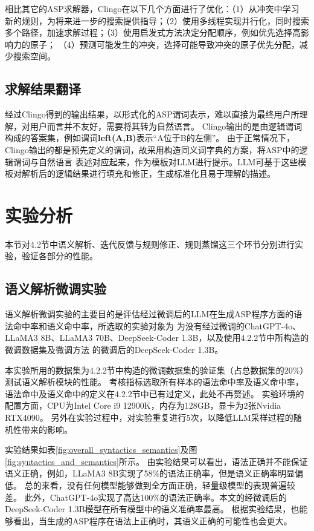 相比其它的ASP求解器，Clingo在以下几个方面进行了优化：（1）从冲突中学习
新的规则，为将来进一步的搜索提供指导；（2）使用多线程实现并行化，同时搜索
多个路径，加速求解过程；（3）使用启发式方法决定分配顺序，例如优先选择高影响力的原子；
（4）预测可能发生的冲突，选择可能导致冲突的原子优先分配，减少搜索空间。
\subsection{求解结果翻译}
经过Clingo得到的输出结果，以形式化的ASP谓词表示，难以直接为最终用户所理解，对用户而言并不友好，需要将其转为自然语言。
Clingo输出的是由逻辑谓词构成的答案集，例如谓词\textbf{left(A,B)}表示“A位于B的左侧”。
由于正常情况下，Clingo输出的都是预先定义的谓词，故采用构造同义词字典的方案，将ASP中的逻辑谓词与自然语言
表述对应起来，作为模板对LLM进行提示。LLM可基于这些模板对解析后的逻辑结果进行填充和修正，生成标准化且易于理解的描述。
\section{实验分析}
本节对4.2节中语义解析、迭代反馈与规则修正、规则蒸馏这三个环节分别进行实验，验证各部分的性能。
\subsection{语义解析微调实验}
语义解析微调实验的主要目的是评估经过微调后的LLM在生成ASP程序方面的语法命中率和语义命中率，所选取的实验对象为
为没有经过微调的ChatGPT-4o、LLaMA3 8B、LLaMA3 70B、DeepSeek-Coder 1.3B，以及使用4.2.2节中所构造的微调数据集及微调方法
的微调后的DeepSeek-Coder 1.3B。

本实验所用的数据集为4.2.2节中构造的微调数据集的验证集（占总数据集的20\%）测试语义解析模块的性能。
考核指标选取所有样本的语法命中率及语义命中率，语法命中及语义命中的定义在4.2.2节中已有过定义，此处不再赘述。
实验环境的配置方面，CPU为Intel Core i9 12900K，内存为128GB，显卡为2张Nvidia RTX4090。
另外在实验过程中，对实验重复进行5次，以降低LLM采样过程的随机性带来的影响。

实验结果如表\ref{fig:overall_syntactics_semantics}及图\ref{fig:syntactics_and_semantics}所示。
由实验结果可以看出，语法正确并不能保证语义正确，例如，LLaMA3 8B实现了58\%的语法正确率，但是语义正确率明显偏低。
总的来看，没有任何模型能够做到全方面正确，轻量级模型的表现普遍较差。
此外，ChatGPT-4o实现了高达100\%的语法正确率。本文的经微调后的DeepSeek-Coder 1.3B模型在所有模型中的语义准确率最高。
根据实验结果，也能够看出，当生成的ASP程序在语法上正确时，其语义正确的可能性也会更大。

